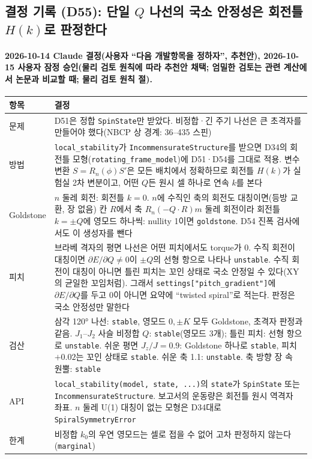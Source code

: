 \subsection{결정 기록 (D55): 단일 $Q$ 나선의 국소 안정성은 회전틀 $H(k)$로 판정한다}\label{decisions-d55-spiral-stability}
\begingroup%
  \framesubtitle{2026-10-14 Claude 결정(사용자 ``다음 개발항목을 정하자'', 추천안), 2026-10-15 사용자 잠정 승인(물리 검토 원칙에 따라 추천안 채택; 엄밀한 검토는 관련 계산에서 논문과 비교할 때; 물리 검토 원칙 절).}
  \small\renewcommand{\arraystretch}{1.12}
  \begin{tabularx}{\textwidth}{@{}P{3.0cm}Y@{}}
    \toprule
    항목 & 결정 \\
    \midrule
    문제 & D51은 정합 \texttt{SpinState}만 받았다. 비정합·긴 주기 나선은 큰 초격자를 만들어야 했다(NBCP 상 경계: 36–435 스핀) \\
    방법 & \texttt{local\_stability}가 \texttt{IncommensurateStructure}를 받으면 D34의 회전틀 모형(\texttt{rotating\_frame\_model})에 D51·D54를 그대로 적용. 변수 변환 $S=R_n(\phi)S'$은 모든 배치에서 정확하므로 회전틀 $H(k)$가 실험실 2차 변분이고, 어떤 $Q$든 원시 셀 하나로 연속 $k$를 본다 \\
    Goldstone & $n$ 둘레 회전: 회전틀 $k=0$. $n$에 수직인 축의 회전도 대칭이면(등방 교환, 장 없음) 칸 $R$에서 축 $R_n(-Q\cdot R)m$ 둘레 회전이라 회전틀 $k=\pm Q$에 영모드 하나씩: nullity 1이면 \texttt{goldstone}. D54 진폭 검사에서도 이 생성자를 뺀다 \\
    피치 & 브라베 격자의 평면 나선은 어떤 피치에서도 torque가 0. 수직 회전이 대칭이면 $\partial E/\partial Q\ne0$이 $\pm Q$의 선형 항으로 나타나 \texttt{unstable}. 수직 회전이 대칭이 아니면 틀린 피치는 꼬인 상태로 국소 안정일 수 있다(XY의 균일한 꼬임처럼). 그래서 \texttt{settings["pitch\_gradient"]}에 $\partial E/\partial Q$를 두고 0이 아니면 요약에 ``twisted spiral''로 적는다. 판정은 국소 안정성만 말한다 \\
    검산 & 삼각 120° 나선: \texttt{stable}, 영모드 $0,\pm K$ 모두 Goldstone, 초격자 판정과 같음. $J_1$–$J_2$ 사슬 비정합 $Q$: \texttt{stable}(영모드 3개); 틀린 피치: 선형 항으로 \texttt{unstable}. 쉬운 평면 $J_z/J=0.9$: Goldstone 하나로 \texttt{stable}, 피치 $+0.02$는 꼬인 상태로 \texttt{stable}. 쉬운 축 1.1: \texttt{unstable}. 축 방향 장 속 원뿔: \texttt{stable} \\
    API & \texttt{local\_stability(model, state, ...)}의 \texttt{state}가 \texttt{SpinState} 또는 \texttt{IncommensurateStructure}. 보고서의 운동량은 회전틀 원시 역격자 좌표. $n$ 둘레 U(1) 대칭이 없는 모형은 D34대로 \texttt{SpiralSymmetryError} \\
    한계 & 비정합 $k_0$의 우연 영모드는 셀로 접을 수 없어 고차 판정하지 않는다(\texttt{marginal}) \\
    \bottomrule
  \end{tabularx}
\endgroup


